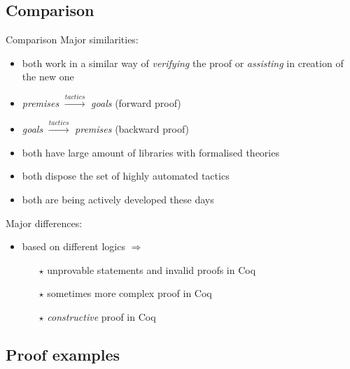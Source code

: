 \documentclass[aspectratio=169, 12pt, fleqn]{beamer}
\begin{document}
\subsection{Comparison}

\begin{frame}{Comparison}
\textcolor{dkblue}{Major similarities:}
\begin{itemize}
  \item both work in a similar way of \textit{verifying} the proof or \textit{assisting} in creation of the new one
  \item \textit{premises} $\xrightarrow{tactics}$ \textit{goals} (forward proof)
  \item \textit{goals} $\xrightarrow{tactics}$ \textit{premises} (backward proof)
  \item both have large amount of libraries with formalised theories
  \item both dispose the set of highly automated tactics
  \item both are being actively developed these days
\end{itemize}

\vspace{10pt}
\textcolor{dkblue}{Major differences:}
\begin{itemize}
  \item based on different logics $\Rightarrow$
  \begin{itemize}
    \item[$\star$] unprovable statements and invalid proofs in Coq
    \item[$\star$] sometimes more complex proof in Coq
    \item[$\star$] \textit{constructive} proof in Coq
    
  \end{itemize}
\end{itemize}

\end{frame}


\subsection{Proof examples}
\end{document}
